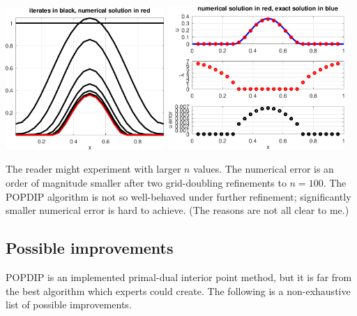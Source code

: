 \documentclass[11pt]{article}
\begin{document}
\medskip
\noindent \mbox{\includegraphics[width=0.45\textwidth]{figs/iteratesobstacle.pdf} \qquad
\includegraphics[width=0.5\textwidth]{figs/errorobstacle.pdf}}

The reader might experiment with larger $n$ values.  The numerical error is an order of magnitude smaller after two grid-doubling refinements to $n=100$.  The POPDIP algorithm is not so well-behaved under further refinement; significantly smaller numerical error is hard to achieve.  (The reasons are not all clear to me.)




\subsection*{Possible improvements}

POPDIP is an implemented primal-dual interior point method, but it is far from the best algorithm which experts could create.  The following is a non-exhaustive list of possible improvements.
\end{document}
